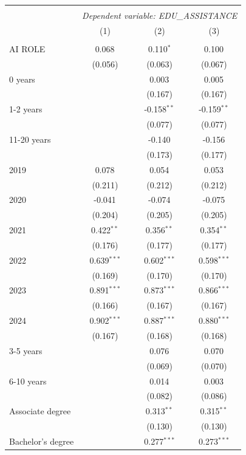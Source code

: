 \begin{table}[!htbp] \centering
\begin{tabular}{@{\extracolsep{5pt}}lccc}
\\[-1.8ex]\hline
\hline \\[-1.8ex]
& \multicolumn{3}{c}{\textit{Dependent variable: EDU_ASSISTANCE}} \
\cr \cline{2-4}
\\[-1.8ex] & (1) & (2) & (3) \\
\hline \\[-1.8ex]
 AI ROLE & 0.068$^{}$ & 0.110$^{*}$ & 0.100$^{}$ \\
& (0.056) & (0.063) & (0.067) \\
 0 years & & 0.003$^{}$ & 0.005$^{}$ \\
& & (0.167) & (0.167) \\
 1-2 years & & -0.158$^{**}$ & -0.159$^{**}$ \\
& & (0.077) & (0.077) \\
 11-20 years & & -0.140$^{}$ & -0.156$^{}$ \\
& & (0.173) & (0.177) \\
 2019 & 0.078$^{}$ & 0.054$^{}$ & 0.053$^{}$ \\
& (0.211) & (0.212) & (0.212) \\
 2020 & -0.041$^{}$ & -0.074$^{}$ & -0.075$^{}$ \\
& (0.204) & (0.205) & (0.205) \\
 2021 & 0.422$^{**}$ & 0.356$^{**}$ & 0.354$^{**}$ \\
& (0.176) & (0.177) & (0.177) \\
 2022 & 0.639$^{***}$ & 0.602$^{***}$ & 0.598$^{***}$ \\
& (0.169) & (0.170) & (0.170) \\
 2023 & 0.891$^{***}$ & 0.873$^{***}$ & 0.866$^{***}$ \\
& (0.166) & (0.167) & (0.167) \\
 2024 & 0.902$^{***}$ & 0.887$^{***}$ & 0.880$^{***}$ \\
& (0.167) & (0.168) & (0.168) \\
 3-5 years & & 0.076$^{}$ & 0.070$^{}$ \\
& & (0.069) & (0.070) \\
 6-10 years & & 0.014$^{}$ & 0.003$^{}$ \\
& & (0.082) & (0.086) \\
 Associate degree & & 0.313$^{**}$ & 0.315$^{**}$ \\
& & (0.130) & (0.130) \\
 Bachelor's degree & & 0.277$^{***}$ & 0.273$^{***}$ \\

\end{tabular}
\end{table}
